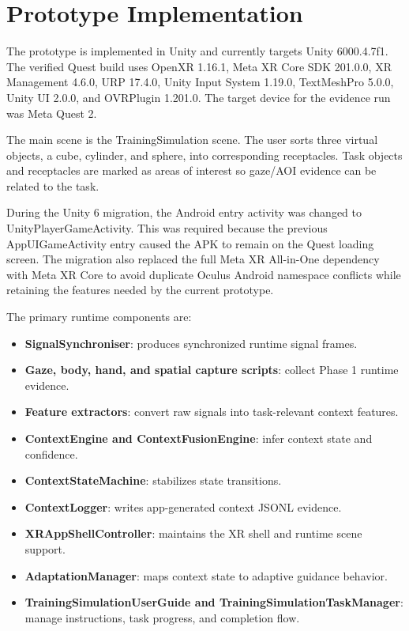 \documentclass[conference]{IEEEtran}
\begin{document}
\section{Prototype Implementation}
The prototype is implemented in Unity and currently targets Unity 6000.4.7f1. The verified Quest build uses OpenXR 1.16.1, Meta XR Core SDK 201.0.0, XR Management 4.6.0, URP 17.4.0, Unity Input System 1.19.0, TextMeshPro 5.0.0, Unity UI 2.0.0, and OVRPlugin 1.201.0. The target device for the evidence run was Meta Quest 2.

The main scene is the TrainingSimulation scene. The user sorts three virtual objects, a cube, cylinder, and sphere, into corresponding receptacles. Task objects and receptacles are marked as areas of interest so gaze/AOI evidence can be related to the task.

During the Unity 6 migration, the Android entry activity was changed to UnityPlayerGameActivity. This was required because the previous AppUIGameActivity entry caused the APK to remain on the Quest loading screen. The migration also replaced the full Meta XR All-in-One dependency with Meta XR Core to avoid duplicate Oculus Android namespace conflicts while retaining the features needed by the current prototype.

The primary runtime components are:
\begin{itemize}
\item \textbf{SignalSynchroniser}: produces synchronized runtime signal frames.
\item \textbf{Gaze, body, hand, and spatial capture scripts}: collect Phase 1 runtime evidence.
\item \textbf{Feature extractors}: convert raw signals into task-relevant context features.
\item \textbf{ContextEngine and ContextFusionEngine}: infer context state and confidence.
\item \textbf{ContextStateMachine}: stabilizes state transitions.
\item \textbf{ContextLogger}: writes app-generated context JSONL evidence.
\item \textbf{XRAppShellController}: maintains the XR shell and runtime scene support.
\item \textbf{AdaptationManager}: maps context state to adaptive guidance behavior.
\item \textbf{TrainingSimulationUserGuide and TrainingSimulationTaskManager}: manage instructions, task progress, and completion flow.
\end{itemize}
\end{document}
